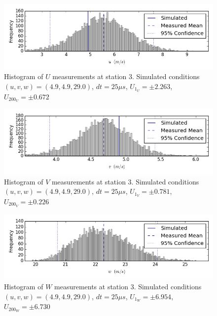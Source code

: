 \begin{figure}[H]
\centering
\includegraphics[width=6in]{figs/Ely_May28th03001/uncertainty_Ely_May28th03001_U}
\caption{Histogram of $U$ measurements at station 3. Simulated conditions $(u,v,w)=(4.9, 4.9, 29.0)$, $dt=25 \mu s$, $U_{1_{U}}=\pm 2.263$, $U_{200_{U}}=\pm 0.672$}
\label{fig:uncertainty_Ely_May28th03001_U}
\end{figure}


\begin{figure}[H]
\centering
\includegraphics[width=6in]{figs/Ely_May28th03001/uncertainty_Ely_May28th03001_V}
\caption{Histogram of $V$ measurements at station 3. Simulated conditions $(u,v,w)=(4.9, 4.9, 29.0)$, $dt=25 \mu s$, $U_{1_{V}}=\pm 0.781$, $U_{200_{V}}=\pm 0.226$}
\label{fig:uncertainty_Ely_May28th03001_V}
\end{figure}


\begin{figure}[H]
\centering
\includegraphics[width=6in]{figs/Ely_May28th03001/uncertainty_Ely_May28th03001_W}
\caption{Histogram of $W$ measurements at station 3. Simulated conditions $(u,v,w)=(4.9, 4.9, 29.0)$, $dt=25 \mu s$, $U_{1_{W}}=\pm 6.954$, $U_{200_{W}}=\pm 6.730$}
\label{fig:uncertainty_Ely_May28th03001_W}
\end{figure}


